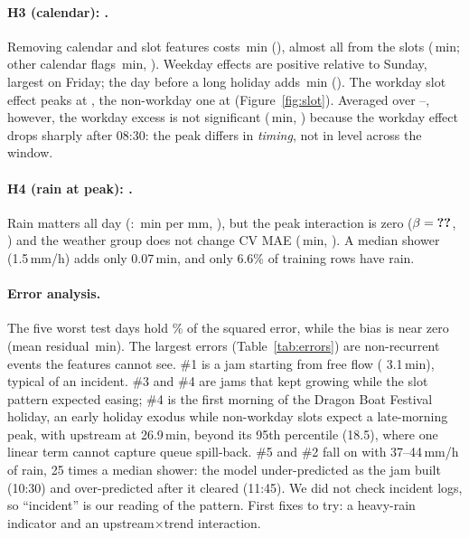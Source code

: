 \paragraph{H3 (calendar): .} Removing calendar and slot features costs
\,min (), almost all from the slots
(\,min; other calendar flags \,min,
). Weekday effects are positive relative to Sunday, largest on
Friday; the day before a long holiday adds \,min
(). The workday slot effect peaks at , the
non-workday one at  (Figure~\ref{fig:slot}). Averaged over
--, however, the workday excess is not significant
(\,min, ) because the workday effect drops sharply
after 08:30: the peak differs in \emph{timing}, not in level across the window.

\paragraph{H4 (rain at peak): .} Rain matters all day (:
\,min per mm, ), but the peak interaction is zero
($\beta=\res{coef.rain_x_peak.beta}$, ) and the weather group does not
change CV MAE (\,min, ). A median shower (1.5\,mm/h) adds only
0.07\,min, and only 6.6\% of training rows have rain.

\paragraph{Error analysis.} The five worst test days hold \% of the squared
error, while the bias is near zero (mean residual \,min). The largest errors
(Table~\ref{tab:errors}) are non-recurrent events the features cannot see. \#1 is a jam starting
from free flow ( 3.1\,min), typical of an incident. \#3 and \#4 are jams that kept
growing while the slot pattern expected easing; \#4 is the first morning of the Dragon Boat
Festival holiday, an early holiday exodus while non-workday slots expect a late-morning peak, with
upstream at 26.9\,min, beyond its 95th percentile (18.5), where one linear term cannot capture
queue spill-back. \#5 and \#2 fall on  with 37--44\,mm/h of rain, 25 times a
median shower: the model under-predicted as the jam built (10:30) and over-predicted after it
cleared (11:45). We did not check incident logs, so ``incident'' is our reading of the pattern.
First fixes to try: a heavy-rain indicator and an upstream$\times$\allowbreak trend interaction.

